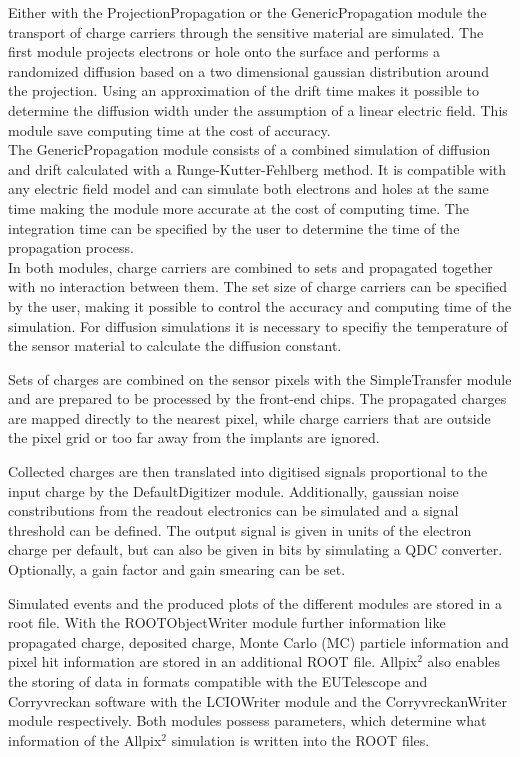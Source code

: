 Either with the ProjectionPropagation or the GenericPropagation module the transport of charge carriers through the sensitive material are simulated.
The first module projects electrons or hole onto the surface and performs a randomized diffusion based on a two dimensional gaussian distribution around
the projection. Using an approximation of the drift time makes it possible to determine the diffusion width under the assumption of a linear electric field. This
module save computing time at the cost of accuracy. \\
The GenericPropagation module consists of a combined simulation of diffusion and drift calculated with a Runge-Kutter-Fehlberg method.
It is compatible with any electric field model and can simulate both electrons and holes
at the same time making the module
more accurate at the cost of computing time. The integration time can be specified by the user to determine the time of the propagation process. \\
In both modules, charge carriers are combined to sets and propagated together with no interaction between them. The set size of charge carriers can be specified by the user,
making it possible to control the accuracy and computing time of the simulation. For diffusion simulations it is necessary to specifiy the temperature of the sensor material
to calculate the diffusion constant.

Sets of charges are combined on the sensor pixels with the SimpleTransfer module and are prepared  to be processed by the front-end chips. The
propagated charges are mapped directly to the nearest pixel, while charge carriers that are outside the pixel grid or too far away from the implants are ignored.

Collected charges are then translated into digitised signals proportional to the input charge by the DefaultDigitizer module. Additionally, gaussian noise constributions
from the readout electronics can be simulated and a signal threshold can be defined. The output signal is given in units of the electron charge per default, but
can also be given in bits by simulating a QDC converter. Optionally, a gain factor and gain smearing can be set.

Simulated events and the produced plots of the different modules are stored in a root file. With the ROOTObjectWriter module further information like propagated charge,
deposited charge, Monte Carlo (MC) particle information and pixel hit information are stored in an additional ROOT file. Allpix$^2$ also enables the storing of
data in formats compatible with the EUTelescope and Corryvreckan software with the LCIOWriter module and the CorryvreckanWriter module respectively. Both modules possess parameters, which
determine what information of the Allpix$^2$ simulation is written into the ROOT files.


